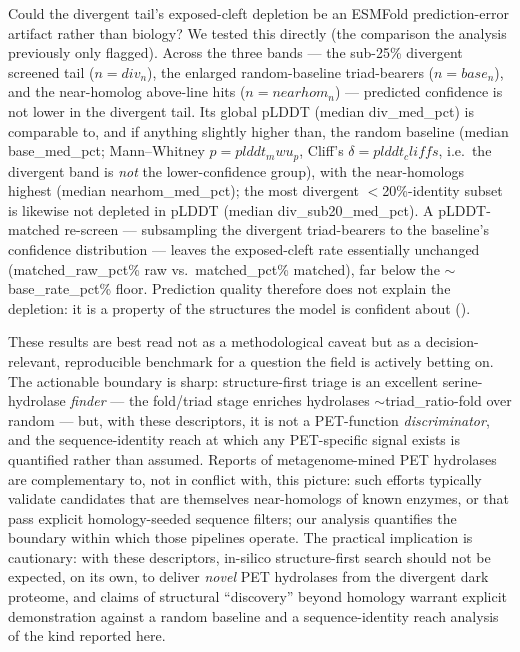 Could the divergent tail's exposed-cleft depletion be an ESMFold prediction-error
artifact rather than biology? We tested this directly (the comparison the analysis
previously only flagged). Across the three bands --- the sub-25\% divergent screened
tail ($n={{div_n}}$), the enlarged random-baseline triad-bearers ($n={{base_n}}$),
and the near-homolog above-line hits ($n={{nearhom_n}}$) --- predicted confidence is
not lower in the divergent tail. Its global pLDDT (median {{div_med_pct}}) is
comparable to, and if anything slightly higher than, the random baseline (median
{{base_med_pct}}; Mann--Whitney $p={{plddt_mwu_p}}$, Cliff's $\delta={{plddt_cliffs}}$,
i.e.\ the divergent band is \emph{not} the lower-confidence group), with the
near-homologs highest (median {{nearhom_med_pct}}); the most divergent $<$20\%-identity
subset is likewise not depleted in pLDDT (median {{div_sub20_med_pct}}). A
pLDDT-matched re-screen --- subsampling the divergent triad-bearers to the baseline's
confidence distribution --- leaves the exposed-cleft rate essentially unchanged
({{matched_raw_pct}}\% raw vs.\ {{matched_pct}}\% matched), far below the
$\sim${{base_rate_pct}}\% floor. Prediction quality therefore does not explain the
depletion: it is a property of the structures the model is confident about
().


These results are best read not as a methodological caveat but as a decision-relevant,
reproducible benchmark for a question the field is actively betting on. The actionable
boundary is sharp: structure-first triage is an excellent serine-hydrolase
\emph{finder} --- the fold/triad stage enriches hydrolases $\sim${{triad_ratio}}-fold
over random --- but, with these descriptors, it is not a PET-function
\emph{discriminator}, and the sequence-identity reach at which any PET-specific signal
exists is quantified rather than assumed. Reports of metagenome-mined PET hydrolases
are complementary to, not in conflict with, this picture: such efforts typically
validate candidates that are themselves near-homologs of known enzymes, or that pass
explicit homology-seeded sequence filters; our analysis quantifies the boundary
within which those pipelines operate. The practical implication is cautionary: with
these descriptors, in-silico structure-first search should not be expected, on its
own, to deliver \emph{novel} PET hydrolases from the divergent dark proteome, and
claims of structural ``discovery'' beyond homology warrant explicit demonstration
against a random baseline and a sequence-identity reach analysis of the kind reported
here.


